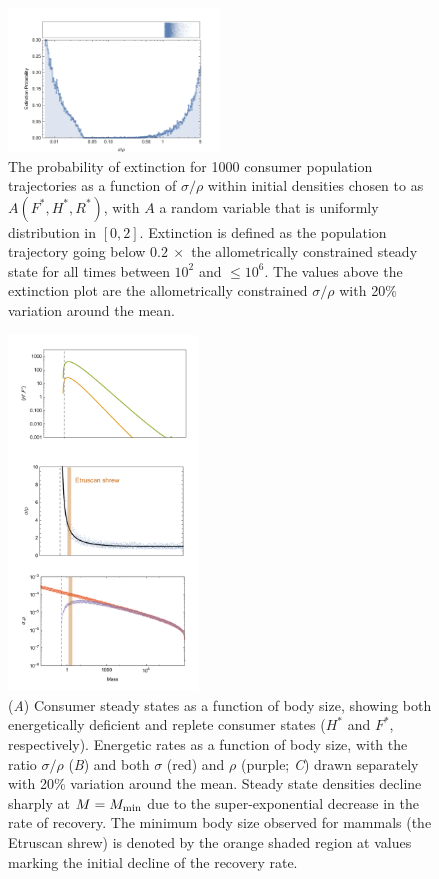\documentclass{pnastwo}
\begin{document}
\begin{figure}
\centering
\includegraphics[width=0.5\textwidth]{fig_ExtinctionAllometric.pdf}
\caption{
The probability of extinction for 1000 consumer population trajectories as a function of $\sigma/\rho$ within initial densities chosen to as $A(F^*,H^*,R^*)$, with $A$ a random
variable that is uniformly distribution in $[0,2]$.
Extinction is defined as the population trajectory going below
$0.2~\times$ the allometrically constrained steady state for all times
between $10^2$ and $\leq 10^6$.
The values above the extinction plot are the allometrically constrained $\sigma/\rho$ with 20\% variation around the mean.
}
\label{fig:ext}
\end{figure} 
 
\begin{figure}
\centering
\includegraphics[width=0.45\textwidth]{fig_FPAllometric.pdf}
\caption{
(\emph{A}) Consumer steady states as a function of body size, showing both energetically deficient and replete consumer states ($H^*$ and $F^*$, respectively). 
Energetic rates as a function of body size, with the ratio $\sigma/\rho$ (\emph{B}) and both $\sigma$ (red) and $\rho$ (purple; \emph{C}) drawn separately with 20\% variation around the mean.
Steady state densities decline sharply at $M=M_{\rm min}$ due to the super-exponential decrease in the rate of recovery.
The minimum body size observed for mammals (the Etruscan shrew) is denoted by the orange shaded region at values marking the initial decline of the recovery rate.
}
\label{fig:mass}
\end{figure}  
 
\end{document}
